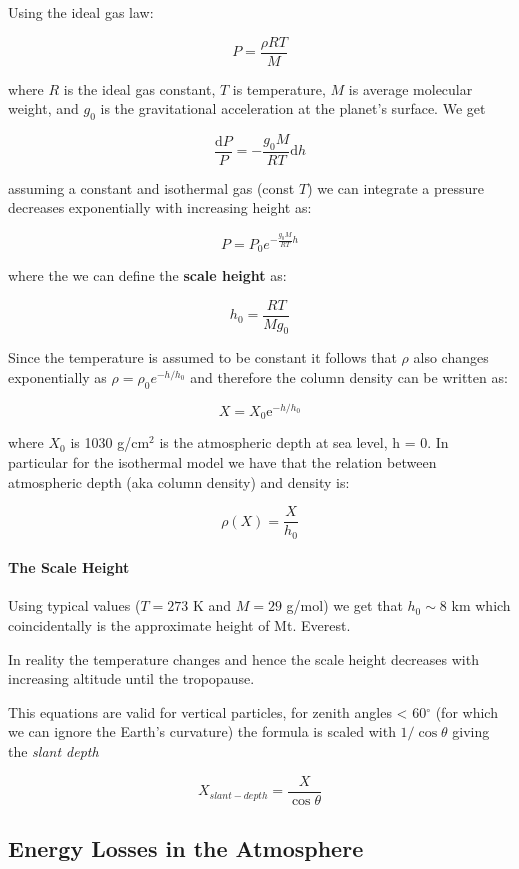 \documentclass[
  letterpaper,
  DIV=11,
  numbers=noendperiod]{scrreprt}
\let\oldparagraph\paragraph
\renewcommand{\paragraph}[1]{\oldparagraph{#1}\mbox{}}
\begin{document}
Using the ideal gas law:

\[ P = \frac{\rho R T}{M}\]

where \(R\) is the ideal gas constant, \(T\) is temperature, \(M\) is
average molecular weight, and \(g_0\) is the gravitational acceleration
at the planet's surface. We get

\[\frac{\mathrm{ d}P}{P} = -\frac{g_0 M}{R T} \mathrm{ d} h\]

assuming a constant and isothermal gas (const \(T\)) we can integrate a
pressure decreases exponentially with increasing height as:

\[P = P_0 e^{-\frac{g_0 M}{R T} h} \]

where the we can define the \textbf{scale height} as:

\[ h_0 = \frac{R T}{M g_0} \]

Since the temperature is assumed to be constant it follows that \(\rho\)
also changes exponentially as \(\rho = \rho_0 e^{-h/h_0}\) and therefore
the column density can be written as:

\[X = X_0 \mathrm{ e}^{-h/h_0}\]

where \(X_0\) is 1030 g/cm\(^{2}\) is the atmospheric depth at sea
level, h = 0. In particular for the isothermal model we have that the
relation between atmospheric depth (aka column density) and density is:

\[ \rho(X) = \frac{X}{h_0} \]

\paragraph{The Scale Height}\label{the-scale-height}

Using typical values (\(T = 273\) K and \(M = 29\) g/mol) we get that
\(h_0 \sim 8\) km which coincidentally is the approximate height of Mt.
Everest.

In reality the temperature changes and hence the scale height decreases
with increasing altitude until the tropopause.

This equations are valid for vertical particles, for zenith angles
\textless{} 60\(^\circ\) (for which we can ignore the Earth's curvature)
the formula is scaled with \(1/\cos{\theta}\) giving the \emph{slant
depth}

\[X_{slant-depth} = \frac{X}{\cos \theta} \]

\subsection{Energy Losses in the
Atmosphere}\label{energy-losses-in-the-atmosphere}
\end{document}
